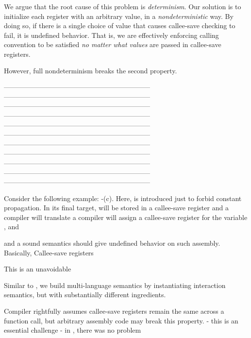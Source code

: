{%
We argue that the root cause of this problem is \textit{determinism}.
Our solution is to initialize each register with an arbitrary value, in a \textit{nondeterministic} way.
By doing so, if there is a single choice of value that causes callee-save checking to fail, it is undefined behavior.
That is, we are effectively enforcing calling convention to be satisfied \textit{no matter what values} are passed in callee-save registers.

However, full nondeterminism breaks the second property.
\todo{}






-----------------------------------------------------------------
-----------------------------------------------------------------
-----------------------------------------------------------------
-----------------------------------------------------------------
-----------------------------------------------------------------
-----------------------------------------------------------------
-----------------------------------------------------------------
-----------------------------------------------------------------
-----------------------------------------------------------------
-----------------------------------------------------------------
-----------------------------------------------------------------

Consider the following example: -(c).
Here,  is introduced just to forbid constant propagation.
In its final target,  will be stored in a callee-save register and
\Eg{} a compiler will translate  a compiler will assign a callee-save register for the variable , and


and a sound semantics should give undefined behavior on such assembly.
Basically, Callee-save registers


This is an unavoidable



Similar to \ccc{}, we build multi-language semantics by instantiating interaction semantics, but with substantially different ingredients.

Compiler rightfully assumes callee-save registers remain the same across a function call, but arbitrary assembly code may break this property.
- this is an essential challenge
- in \scc{}, there was no problem

}
